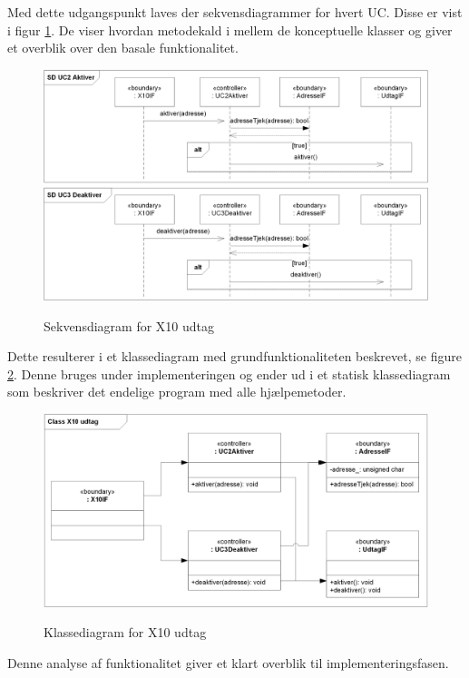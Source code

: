 Med dette udgangspunkt laves der sekvensdiagrammer for hvert UC. Disse er vist i figur \ref{fig:X10_udtag_sd}. De viser hvordan metodekald i mellem de konceptuelle klasser og giver et overblik over den basale funktionalitet.

\begin{figure}[!htb]
     \centering
     { \includegraphics{Billeder/UML/X10_modtager_SD}}
     \caption{Sekvensdiagram for X10 udtag}
     \label{fig:X10_udtag_sd}
\end{figure}

Dette resulterer i et klassediagram med grundfunktionaliteten beskrevet, se figure \ref{fig:X10_udtag_class}. Denne bruges under implementeringen og ender ud i et statisk klassediagram som beskriver det endelige program med alle hjælpemetoder.

\begin{figure}[!htb]
     \centering
     { \includegraphics{Billeder/UML/X10_modtager_Class}}
     \caption{Klassediagram for X10 udtag}
     \label{fig:X10_udtag_class}
\end{figure}

Denne analyse af funktionalitet giver et klart overblik til implementeringsfasen.